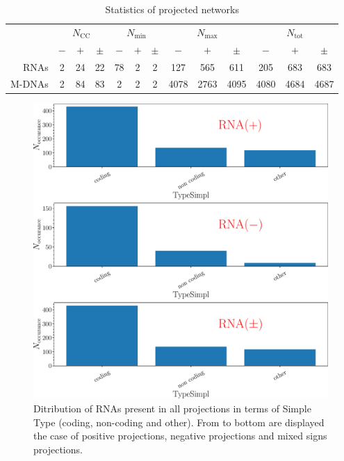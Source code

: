 \documentclass[10pt,a4paper]{article}
\begin{document}
\begin{table}[h!]
\centering
\caption{\label{tab:stat}Statistics of projected networks}
\begin{tabular}{|r|c|c|c|c|c|c|c|c|c|c|c|c|}
\cline{2-13}
\multicolumn{1}{c|}{}&\multicolumn{3}{c|}{$N_{\mathrm{CC}}$}&\multicolumn{3}{c}{$N_{\mathrm{min}}$}&\multicolumn{3}{|c}{$N_{\mathrm{max}}$}&\multicolumn{3}{|c|}{$N_{\mathrm{tot}}$}\\
\cline{2-13}
\multicolumn{1}{c|}{}&$-$&$+$&$\pm$&$-$&$+$&$\pm$&$-$&$+$&$\pm$&$-$&$+$&$\pm$\\
\hline
RNAs&2&24&22&78&2&2&127&565&611&205&683&683\\
M-DNAs&2&84&83&2&2&2&4078&2763&4095&4080&4684&4687\\
\hline
\end{tabular}
\end{table}
\begin{figure}[h!]
\centering
\includegraphics[scale=0.3]{dist-TypeSimpl-size.pdf}
\caption{\label{fig:TypSimpl-distr}Ditribution of RNAs present in all projections in terms of Simple Type (coding, non-coding and other). From to bottom are displayed the case of positive projections, negative projections and mixed signs projections.}
\end{figure}
\end{document}
